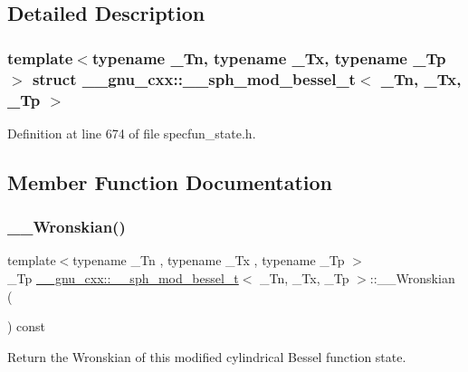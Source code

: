 \subsection{Detailed Description}
\subsubsection*{template$<$typename \+\_\+\+Tn, typename \+\_\+\+Tx, typename \+\_\+\+Tp$>$\newline
struct \+\_\+\+\_\+gnu\+\_\+cxx\+::\+\_\+\+\_\+sph\+\_\+mod\+\_\+bessel\+\_\+t$<$ \+\_\+\+Tn, \+\_\+\+Tx, \+\_\+\+Tp $>$}



Definition at line 674 of file specfun\+\_\+state.\+h.



\subsection{Member Function Documentation}
\mbox{\label{struct____gnu__cxx_1_1____sph__mod__bessel__t_afbe229c1b0faafc786c78eee38e52d0a}} 
\subsubsection{\texorpdfstring{\+\_\+\+\_\+\+Wronskian()}{\_\_Wronskian()}}
{\footnotesize\ttfamily template$<$typename \+\_\+\+Tn , typename \+\_\+\+Tx , typename \+\_\+\+Tp $>$ \\
\+\_\+\+Tp \hyperlink{struct____gnu__cxx_1_1____sph__mod__bessel__t}{\+\_\+\+\_\+gnu\+\_\+cxx\+::\+\_\+\+\_\+sph\+\_\+mod\+\_\+bessel\+\_\+t}$<$ \+\_\+\+Tn, \+\_\+\+Tx, \+\_\+\+Tp $>$\+::\+\_\+\+\_\+\+Wronskian (\begin{DoxyParamCaption}{ }\end{DoxyParamCaption}) const\hspace{0.3cm}{\ttfamily [inline]}}



Return the Wronskian of this modified cylindrical Bessel function state. 



